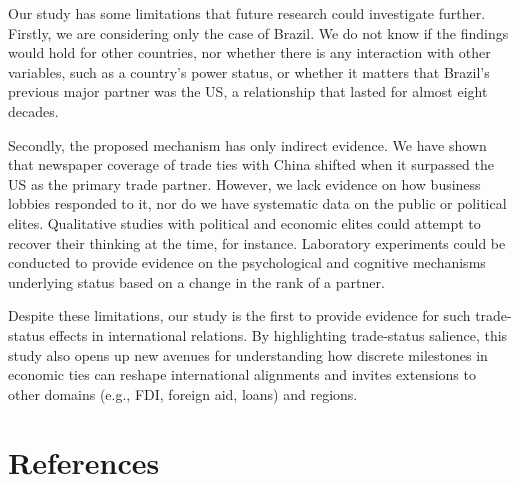\documentclass[
  12pt,
]{article}
\begin{document}
Our study has some limitations that future research could investigate
further. Firstly, we are considering only the case of Brazil. We do not
know if the findings would hold for other countries, nor whether there
is any interaction with other variables, such as a country's power
status, or whether it matters that Brazil's previous major partner was
the US, a relationship that lasted for almost eight decades.

Secondly, the proposed mechanism has only indirect evidence. We have
shown that newspaper coverage of trade ties with China shifted when it
surpassed the US as the primary trade partner. However, we lack evidence
on how business lobbies responded to it, nor do we have systematic data
on the public or political elites. Qualitative studies with political
and economic elites could attempt to recover their thinking at the time,
for instance. Laboratory experiments could be conducted to provide
evidence on the psychological and cognitive mechanisms underlying status
based on a change in the rank of a partner.

Despite these limitations, our study is the first to provide evidence
for such trade-status effects in international relations. By
highlighting trade-status salience, this study also opens up new avenues
for understanding how discrete milestones in economic ties can reshape
international alignments and invites extensions to other domains (e.g.,
FDI, foreign aid, loans) and regions.

\section*{References}\label{references}
\end{document}
